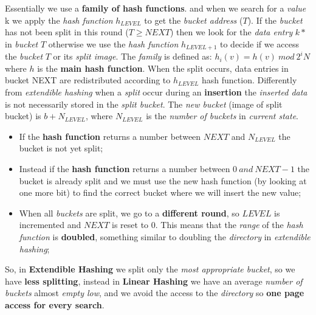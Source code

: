 \documentclass{article}
\begin{document}
Essentially we use a \textbf{family of hash functions}. and when we search for a \emph{value} k we apply the \emph{hash function} $h_{LEVEL}$ to get the \emph{bucket address} ($T$). If the \emph{bucket} has not been split in this round ($T \geq NEXT$) then we look for the \emph{data entry} $k*$ in \emph{bucket} $T$ otherwise we use the \emph{hash function} $h_{LEVEL+1}$ to decide if we access the \emph{bucket} $T$ or its \emph{split image}. The \emph{family} is defined as: $h_i(v) = h(v)\ mod\ 2^iN$ where $h$ is the \textbf{main hash function}. When the split occurs, data entries in bucket NEXT are redistributed according to $h_{LEVEL}$ hash function. Differently from \emph{extendible hashing} when a \emph{split} occur during an \textbf{insertion} the \emph{inserted data} is not necessarily stored in the \emph{split bucket}. The \emph{new bucket} (image of split bucket) is $b+N_{LEVEL}$, where $N_{LEVEL}$ is the \emph{number of buckets} in \emph{current state}. 
\begin{itemize}
\item If the \textbf{hash function} returns a number between $NEXT$ and $N_{LEVEL}$ the bucket is not yet split;
\item Instead if the \textbf{hash function} returns a number between $0\ and\ NEXT-1$ the bucket is already split and we must use the new hash function (by looking at one more bit) to find the correct bucket where we will insert the new value;
\item When all \emph{buckets} are split, we go to a \textbf{different round}, so $LEVEL$ is incremented and $NEXT$ is reset to 0. This means that the \emph{range} of the \emph{hash function} is \textbf{doubled}, something similar to doubling the \emph{directory} in \emph{extendible hashing};
\end{itemize}
So, in \textbf{Extendible Hashing} we split only the \emph{most appropriate bucket}, so we have \textbf{less splitting}, instead in \textbf{Linear Hashing} we have an average \emph{number of buckets} almost \emph{empty low}, and we avoid the access to the \emph{directory} so \textbf{one page access for every search}. 
\end{document}
